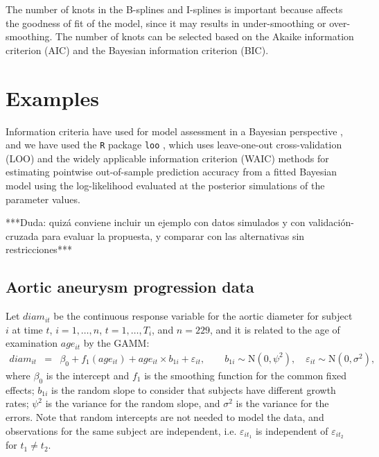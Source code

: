 \documentclass[11pt,letterpaper]{article}
\begin{document}
The number of knots in the B-splines and I-splines is important because affects the goodness of fit of the model, since it may results in under-smoothing or over-smoothing. 
The number of knots can be selected based on the Akaike information criterion (AIC) and the Bayesian information criterion (BIC).




\section{Examples}\label{sec:examples}




Information criteria have used for model assessment in a Bayesian perspective \citep{GelHwaVeh13}, and  we have used the \texttt{R} package \texttt{loo} \citep{VehGelGab17}, which uses leave-one-out cross-validation (LOO) and the widely applicable information criterion (WAIC) methods for estimating pointwise out-of-sample prediction accuracy from a fitted Bayesian model using the log-likelihood evaluated at the posterior simulations of the parameter values. 

***Duda: quiz\'a conviene incluir un ejemplo con datos simulados y con validaci\'on-cruzada para evaluar la propuesta, y comparar con las alternativas sin restricciones***

\subsection{Aortic aneurysm progression data}  

Let $diam_{it}$ be the continuous response variable for the aortic diameter for subject $i$ at time $t$, $i=1,\ldots,n$,   $t=1,\ldots,T_i$,  and $n=229$, and it is related to the age of examination $age_{it}$ by the GAMM:  
\begin{eqnarray*}
diam_{it} &=& \beta_0 + f_1(age_{it}) +age_{it} \times b_{1i} + \varepsilon_{it}, 
\qquad 
b_{1i}\sim\mathrm{N}(0,\psi^2), 
\quad 
\varepsilon_{it}\sim\mathrm{N}(0,\sigma^2)  ,
\end{eqnarray*}
where $\beta_0$ is the intercept and $f_1$ is the smoothing function for the common fixed effects; $b_{1i}$ is the random slope to consider that subjects have different growth rates; $\psi^2$ is the variance for the random slope, and $\sigma^2$ is the variance for the errors. Note that random intercepts are not needed to model the data, and observations for the same subject are independent, i.e. $\varepsilon_{it_1}$ is independent of  $\varepsilon_{it_2}$ for $t_1\neq t_2$. 
\end{document}
